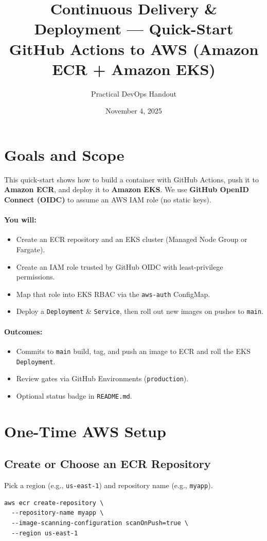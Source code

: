 \documentclass[11pt]{article}
\title{Continuous Delivery \& Deployment --- Quick-Start\\
GitHub Actions to AWS (Amazon ECR + Amazon EKS)}
\author{Practical DevOps Handout}
\date{November 4, 2025}
\begin{document}
\maketitle
\tableofcontents
\clearpage

\section{Goals and Scope}
This quick-start shows how to build a container with GitHub Actions, push it to \textbf{Amazon ECR}, and deploy it to \textbf{Amazon EKS}. We use \textbf{GitHub OpenID Connect (OIDC)} to assume an AWS IAM role (no static keys).

\paragraph{You will:}
\begin{itemize}
  \item Create an ECR repository and an EKS cluster (Managed Node Group or Fargate).
  \item Create an IAM role trusted by GitHub OIDC with least-privilege permissions.
  \item Map that role into EKS RBAC via the \texttt{aws-auth} ConfigMap.
  \item Deploy a \texttt{Deployment} \& \texttt{Service}, then roll out new images on pushes to \texttt{main}.
\end{itemize}

\paragraph{Outcomes:}
\begin{itemize}
  \item Commits to \texttt{main} build, tag, and push an image to ECR and roll the EKS \texttt{Deployment}.
  \item Review gates via GitHub Environments (\texttt{production}).
  \item Optional status badge in \texttt{README.md}.
\end{itemize}

\section{One-Time AWS Setup}
\subsection{Create or Choose an ECR Repository}
Pick a region (e.g., \texttt{us-east-1}) and repository name (e.g., \texttt{myapp}).
\begin{verbatim}
aws ecr create-repository \
  --repository-name myapp \
  --image-scanning-configuration scanOnPush=true \
  --region us-east-1
\end{verbatim}
\end{document}
